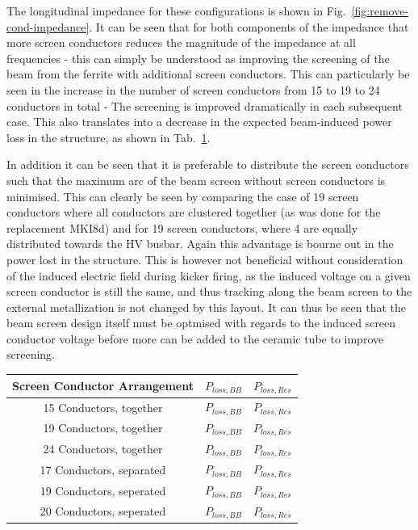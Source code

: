The longitudinal impedance for these configurations is shown in Fig.~\ref{fig:remove-cond-impedance}. It can be seen that for both components of the impedance that more screen conductors reduces the magnitude of the impedance at all frequencies - this can simply be understood as improving the screening of the beam from the ferrite with additional screen conductors. This can particularly be seen in the increase in the number of screen conductors from 15 to 19 to 24 conductors in total - The screening is improved dramatically in each subsequent case. This also translates into a decrease in the expected beam-induced power loss in the structure, as shown in Tab.~\ref{tab:power-loss-cond-removal}. 

In addition it can be seen that it is preferable to distribute the screen conductors such that the maximum arc of the beam screen without screen conductors is minimised. This can clearly be seen by comparing the case of 19 screen conductors where all conductors are clustered together (as was done for the replacement MKI8d) and for 19 screen conductors, where 4 are equally distributed towards the HV busbar. Again this advantage is bourne out in the power lost in the structure. This is however not beneficial without consideration of the induced electric field during kicker firing, as the induced voltage on a given screen conductor is still the same, and thus tracking along the beam screen to the external metallization is not changed by this layout. It can thus be seen that the beam screen design itself must be optmised with regards to the induced screen conductor voltage before more can be added to the ceramic tube to improve screening.

\begin{table}
\label{tab:power-loss-cond-removal}
\begin{center}
\begin{tabular}{c | c | c}
Screen Conductor Arrangement & $P_{loss, BB}$ & $P_{loss, Res}$ \\ \hline
15 Conductors, together & $P_{loss, BB}$ & $P_{loss, Res}$ \\ \hline
19 Conductors, together & $P_{loss, BB}$ & $P_{loss, Res}$ \\ \hline
24 Conductors, together & $P_{loss, BB}$ & $P_{loss, Res}$ \\ \hline
17 Conductors, separated & $P_{loss, BB}$ & $P_{loss, Res}$ \\ \hline
19 Conductors, seperated & $P_{loss, BB}$ & $P_{loss, Res}$ \\ \hline
20 Conductors, seperated & $P_{loss, BB}$ & $P_{loss, Res}$ \\ \hline
\end{tabular}
\end{center}
\end{table}

